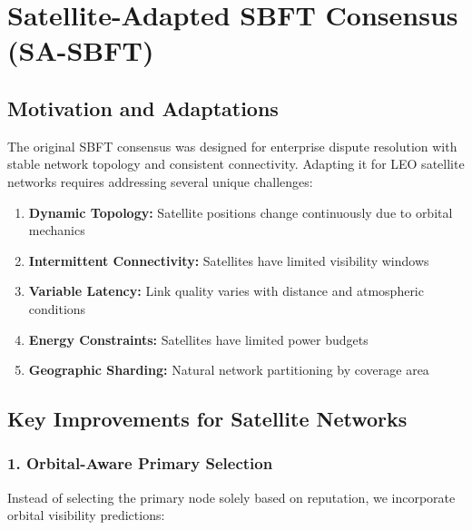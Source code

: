 
\section{Satellite-Adapted SBFT Consensus (SA-SBFT)}

\subsection{Motivation and Adaptations}

The original SBFT consensus was designed for enterprise dispute resolution with stable network topology and consistent connectivity. Adapting it for LEO satellite networks requires addressing several unique challenges:

\begin{enumerate}
    \item \textbf{Dynamic Topology:} Satellite positions change continuously due to orbital mechanics
    \item \textbf{Intermittent Connectivity:} Satellites have limited visibility windows
    \item \textbf{Variable Latency:} Link quality varies with distance and atmospheric conditions
    \item \textbf{Energy Constraints:} Satellites have limited power budgets
    \item \textbf{Geographic Sharding:} Natural network partitioning by coverage area
\end{enumerate}

\subsection{Key Improvements for Satellite Networks}

\subsubsection{1. Orbital-Aware Primary Selection}

Instead of selecting the primary node solely based on reputation, we incorporate orbital visibility predictions:

